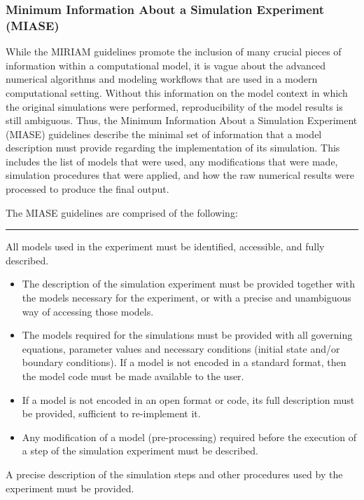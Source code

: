 \subsubsection{Minimum Information About a Simulation Experiment
(MIASE)}

While the MIRIAM guidelines promote the inclusion of many crucial pieces
of information within a computational model, it is vague about the
advanced numerical algorithms and modeling workflows that are used in a
modern computational setting. Without this information on the model
context in which the original simulations were performed,
reproducibility of the model results is still ambiguous. Thus, the
Minimum Information About a Simulation Experiment (MIASE) guidelines
\autocite{waltemath2011minimum} describe the minimal set of information
that a model description must provide regarding the implementation of
its simulation. This includes the list of models that were used, any
modifications that were made, simulation procedures that were applied,
and how the raw numerical results were processed to produce the final
output.

The MIASE guidelines are comprised of the following:

\begin{center}\rule{3in}{0.4pt}\end{center}

All models used in the experiment must be identified, accessible, and
fully described.

\begin{itemize}
\item
  The description of the simulation experiment must be provided together
  with the models necessary for the experiment, or with a precise and
  unambiguous way of accessing those models.
\item
  The models required for the simulations must be provided with all
  governing equations, parameter values and necessary conditions
  (initial state and/or boundary conditions). If a model is not encoded
  in a standard format, then the model code must be made available to
  the user.
\item
  If a model is not encoded in an open format or code, its full
  description must be provided, sufficient to re-implement it.
\item
  Any modification of a model (pre-processing) required before the
  execution of a step of the simulation experiment must be described.
\end{itemize}
A precise description of the simulation steps and other procedures used
by the experiment must be provided.

